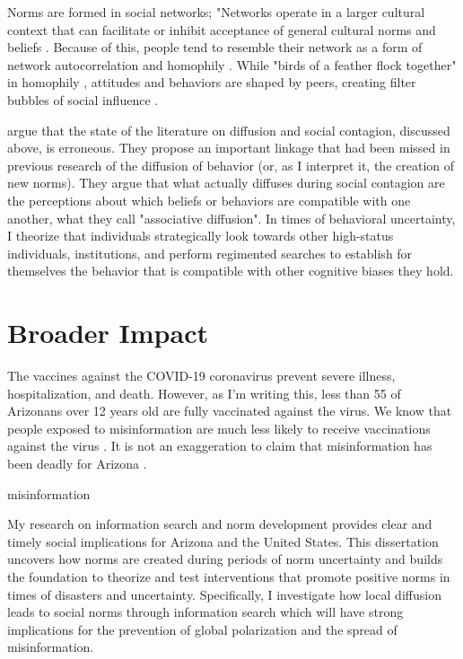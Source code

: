 Norms are formed in social networks; "Networks operate in a larger
cultural context that can facilitate or inhibit acceptance of general
cultural norms and beliefs \citep{pescosolidoDurkheimSuicideReligion1989, whiteSocialStructureMultiple1976}. Because of this, people tend to resemble
their network as a form of network autocorrelation and homophily
\citep{dellapostaWhyLiberalsDrink2015}. While "birds of a feather flock
together" in homophily \citep{mcphersonBirdsFeatherHomophily2001},
attitudes and behaviors are shaped by peers, creating filter bubbles of
social influence \citep{dellapostaWhyLiberalsDrink2015}.

\citet{goldbergSocialContagionAssociative2018} argue that the state of the literature on
diffusion and social contagion, discussed above, is erroneous. They
propose an important linkage that had been missed in previous research
of the diffusion of behavior (or, as I interpret it, the creation of new
norms). They argue that what actually diffuses during social contagion
are the perceptions about which beliefs or behaviors are compatible with
one another, what they call "associative diffusion". In times of
behavioral uncertainty, I theorize that individuals strategically look
towards other high-status individuals, institutions, and perform
regimented searches to establish for themselves the behavior that is
compatible with other cognitive biases they hold.

\section{Broader Impact}


The vaccines against the COVID-19 coronavirus prevent severe illness,
hospitalization, and death. However, as I'm writing this, less than 55%
of Arizonans over 12 years old are fully vaccinated against the virus.
We know that people exposed to misinformation are much less likely to
receive vaccinations against the virus \citep{loombaMeasuringImpactCOVID192021}. It is not
an exaggeration to claim that misinformation has been deadly for Arizona
\citep{pathakInfodemicsCOVID19Role2020}.

misinformation \citep{greene_murphy21}

My research on information search and norm development provides clear
and timely social implications for Arizona and the United States. This
dissertation uncovers how norms are created during periods of norm
uncertainty and builds the foundation to theorize and test interventions
that promote positive norms in times of disasters and uncertainty.
Specifically, I investigate how local diffusion leads to social norms
through information search which will have strong implications for the
prevention of global polarization and the spread of misinformation.

